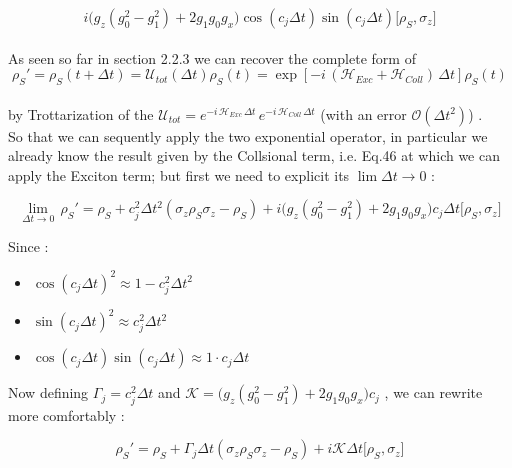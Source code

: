 \documentclass[a4paper,12pt]{article}
\begin{document}
	  \begin{equation}
	  	i \Big( g_{z}\left(g_{0}^{2} - g_{1}^{2} \right) + 2 g_{1} g_{0} g_{x} \Big) \cos{\left(c_j \Delta t \right)} \sin{\left(c_j \Delta t \right)} \Big[\rho_S , \sigma_{z} \Big]
	  \end{equation}
	  \\
	  As seen so far in section 2.2.3 we can recover the complete form of  
	  \begin{equation}
		\rho_S' = \rho_S (t + \Delta t) = \mathcal{U}_{tot}(\Delta t) \rho_S (t) = \exp{\left[-i \, \left(\mathcal{H}_{Exc} + \mathcal{H}_{Coll} \right) \, \Delta t \right]} \rho_S (t)
	  \end{equation}\\	  
	  by Trottarization of the $ \mathcal{U}_{tot} = e^{-i \, \mathcal{H}_{Exc} \, \Delta t } \, e^{-i \, \mathcal{H}_{Coll} \, \Delta t }  $ (with an error $ \mathcal{O}\left(\Delta t^2\right) $) .\\
	  So that we can sequently apply the two exponential operator, in particular we already know the result given by the Collsional term, i.e. Eq.46 at which we can apply the Exciton term; but first we need to explicit its $ \lim{\Delta t \rightarrow 0} $ : 
	  
	  \begin{equation}
	  	\lim\limits_{\Delta t \rightarrow 0} \, \rho_S' = \rho_S + c_{j}^{2} \Delta t ^{2} \left( \sigma_{z} \rho_S \sigma_{z} - \rho_S \right) + i \Big( g_{z}\left(g_{0}^{2} - g_{1}^{2} \right) + 2 g_{1} g_{0} g_{x} \Big) c_j \Delta t [\rho_S , \sigma_{z} \Big] 
	  \end{equation} 
	  

	   	Since : \begin{itemize}
	   	\item $ \cos{\left(c_j \Delta t \right)}^{2} \approx 1 - c_{j}^{2} \Delta t ^{2} $
	   	\item $ \sin{\left(c_j \Delta t \right)}^{2} \approx c_{j}^{2} \Delta t ^{2} $
	   	\item $ \cos{\left(c_j \Delta t \right)} \sin{\left(c_j \Delta t \right)} \approx 1 \cdot c_j \Delta t  $
	   \end{itemize}
	   
	   Now defining $ \Gamma_{j} = c_{j}^{2} \Delta t $ and $ \mathcal{K} = \Big( g_{z}\left(g_{0}^{2} - g_{1}^{2} \right) + 2 g_{1} g_{0} g_{x} \Big) c_j $ , we can rewrite more comfortably : 
	   
	   \begin{equation}
	   	\rho_S' = \rho_S + \Gamma_{j} \Delta t \left( \sigma_{z} \rho_S \sigma_{z} - \rho_S \right) + i \mathcal{K} \Delta t \Big[ \rho_S , \sigma_{z} \Big]
	   \end{equation}
	   
\end{document}

